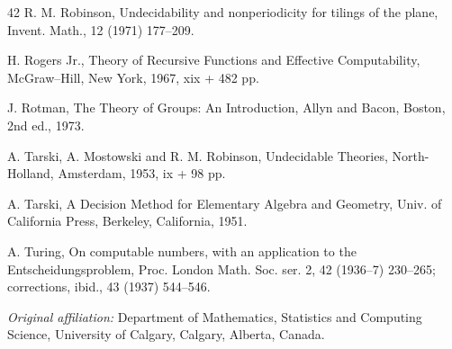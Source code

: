 \documentclass[11pt]{article}
\begin{document}
\begin{thebibliography}{42}
 R. M. Robinson, Undecidability and nonperiodicity for tilings of the plane, Invent. Math., 12 (1971) 177--209.

 H. Rogers Jr., Theory of Recursive Functions and Effective Computability, McGraw--Hill, New York, 1967, xix + 482 pp.

 J. Rotman, The Theory of Groups: An Introduction, Allyn and Bacon, Boston, 2nd ed., 1973.

 A. Tarski, A. Mostowski and R. M. Robinson, Undecidable Theories, North-Holland, Amsterdam, 1953, ix + 98 pp.

 A. Tarski, A Decision Method for Elementary Algebra and Geometry, Univ. of California Press, Berkeley, California, 1951.

 A. Turing, On computable numbers, with an application to the Entscheidungsproblem, Proc. London Math. Soc. ser. 2, 42 (1936--7) 230--265; corrections, ibid., 43 (1937) 544--546.
\end{thebibliography}

\bigskip
\noindent\textit{Original affiliation:} Department of Mathematics, Statistics and Computing Science, University of Calgary, Calgary, Alberta, Canada.
\end{document}
